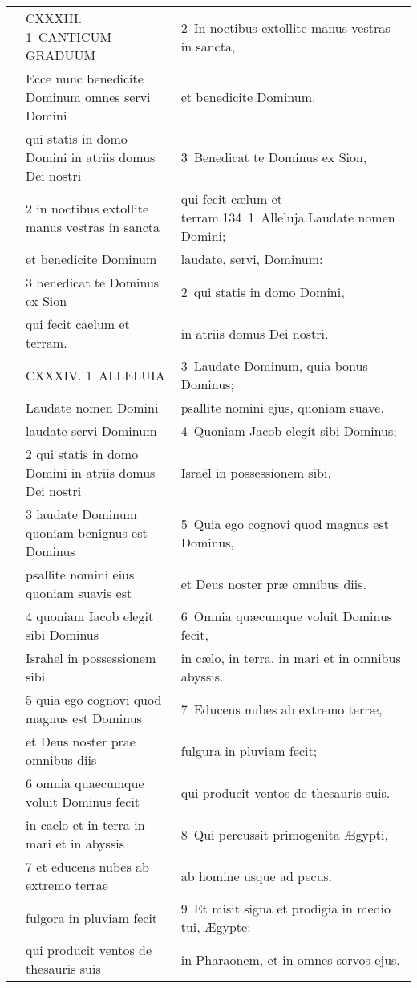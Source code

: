 \documentclass{article}
\begin{document}
\begin{longtable}{@{}p{}p{}p{}@{}}
	&	CXXXIII. 1 CANTICUM GRADUUM	&	2 In noctibus extollite manus vestras in sancta,	\\
	&	Ecce nunc benedicite Dominum omnes servi Domini	&	et benedicite Dominum.	\\
	&	qui statis in domo Domini in atriis domus Dei nostri	&	3 Benedicat te Dominus ex Sion,	\\
	&	2 in noctibus extollite manus vestras in sancta	&	qui fecit cælum et terram.134 1 Alleluja.Laudate nomen Domini;	\\
	&	et benedicite Dominum	&	laudate, servi, Dominum:	\\
	&	3 benedicat te Dominus ex Sion	&	2 qui statis in domo Domini,	\\
	&	qui fecit caelum et terram.	&	in atriis domus Dei nostri.	\\
	&	CXXXIV. 1 ALLELUIA	&	3 Laudate Dominum, quia bonus Dominus;	\\
	&	Laudate nomen Domini	&	psallite nomini ejus, quoniam suave.	\\
	&	laudate servi Dominum	&	4 Quoniam Jacob elegit sibi Dominus;	\\
	&	2 qui statis in domo Domini in atriis domus Dei nostri	&	Israël in possessionem sibi.	\\
	&	3 laudate Dominum quoniam benignus est Dominus	&	5 Quia ego cognovi quod magnus est Dominus,	\\
	&	psallite nomini eius quoniam suavis est	&	et Deus noster præ omnibus diis.	\\
	&	4 quoniam Iacob elegit sibi Dominus	&	6 Omnia quæcumque voluit Dominus fecit,	\\
	&	Israhel in possessionem sibi	&	in cælo, in terra, in mari et in omnibus abyssis.	\\
	&	5 quia ego cognovi quod magnus est Dominus	&	7 Educens nubes ab extremo terræ,	\\
	&	et Deus noster prae omnibus diis	&	fulgura in pluviam fecit;	\\
	&	6 omnia quaecumque voluit Dominus fecit	&	qui producit ventos de thesauris suis.	\\
	&	in caelo et in terra in mari et in abyssis	&	8 Qui percussit primogenita Ægypti,	\\
	&	7 et educens nubes ab extremo terrae	&	ab homine usque ad pecus.	\\
	&	fulgora in pluviam fecit	&	9 Et misit signa et prodigia in medio tui, Ægypte:	\\
	&	qui producit ventos de thesauris suis	&	in Pharaonem, et in omnes servos ejus.	\\

\end{longtable}
\end{document}
